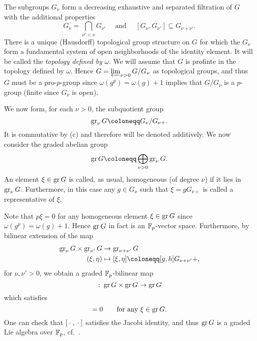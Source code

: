 The subgroups $G_{\nu}$ form a decreasing exhaustive and separated filtration of $G$ with the additional properties
\begin{equation*}
  G_{\nu} = \bigcap_{\nu'<\nu}G_{\nu'} \quad \text{ and } \quad [G_\nu,G_{\nu'}] \subseteq G_{\nu+\nu'}.
\end{equation*}
There is a unique (Hausdorff) topological group structure on $G$ for which the $G_\nu$ form a fundamental system of open neighborhoods of the identity element. It will be called the \emph{topology defined by $\omega$}. We will assume that $G$ is profinte in the topology defined by $\omega$. Hence $G = \projlim_{\nu > 0} G/G_{\nu}$ as topological groups, and thus $G$ must be a pro-$p$-group since $\omega(g^{p}) = \omega(g) + 1$ implies that $G/G_{\nu}$ is a $p$-group (finite since $G_{\nu}$ is open).

We now form, for each $\nu>0$, the subquotient group
\begin{equation*}
  \gr_\nu G \coloneqq G_\nu/G_{\nu+}.
\end{equation*}%
%
It is commutative by (c) and therefore will be denoted additively. We now consider the graded abelian group
\begin{equation*}
  \gr G \coloneqq \bigoplus_{\nu>0} \gr_\nu G.
\end{equation*}%
%
An element $\xi \in \gr G$ is called, as usual, homogeneous (of degree $\nu$) if it lies in $\gr_\nu G$. Furthermore, in this case any $g\in G_\nu$ such that $\xi = gG_{\nu+}$ is called a representative of $\xi$.

Note that $p\xi = 0$ for any homogeneous element $\xi \in \gr G$ since $\omega(g^{p}) = \omega(g) + 1$. Hence $\gr G$ in fact is an $\F_p$-vector space. Furthermore, by bilinear extension of the map
\begin{align*}
  \gr_\nu G \times \gr_{\nu'} G &\to \gr_{\nu+\nu'} G \\
  (\xi,\eta) &\mapsto [\xi,\eta]\coloneqq [g,h]G_{\nu+\nu'}+,
\end{align*}
for $\nu,\nu'>0$, we obtain a graded $\F_p$-bilinear map
\begin{equation*}
  [\edot,\edot] \colon \gr G \times \gr G \to \gr G
\end{equation*}
which satisfies
\begin{equation*}
  [\xi,\xi]=0 \qquad \text{for any }\xi\in\gr G.
\end{equation*}
One can check that $[\edot,\edot]$ satisfies the Jacobi identity, and thus $\gr G$ is a graded Lie algebra over $\F_p$, cf.\ \cite[Sect.~23]{Sch}.

